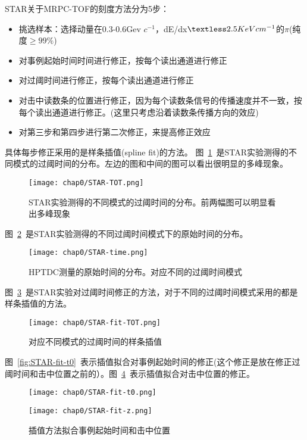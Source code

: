 STAR关于MRPC-TOF的刻度方法分为5步：
\begin{itemize}
\item{挑选样本：选择动量在0.3-0.6Gev $c^{-1}$，dE/dx$\textless2.5KeV cm^{-1}$的$\pi$(纯度$\geq99$$\%$)}
\item{对事例起始时间时间进行修正，按每个读出通道进行修正}
\item{对过阈时间进行修正，按每个读出通道进行修正}
\item{对击中读数条的位置进行修正，因为每个读数条信号的传播速度并不一致，按每个读出通道进行修正。(这里只考虑沿着读数条传播方向的效应)}
\item{对第三步和第四步进行第二次修正，来提高修正效应}
\end{itemize}

具体每步修正采用的是样条插值(spline fit)的方法。
图~\ref{fig:STAR-TOT}~是STAR实验测得的不同模式的过阈时间的分布。左边的图和中间的图可以看出很明显的多峰现象。
\begin{figure}[!h]
  \centering
  \texttt{[image: chap0/STAR-TOT.png]}
  \caption{STAR实验测得的不同模式的过阈时间的分布。前两幅图可以明显看出多峰现象}
  \label{fig:STAR-TOT}
\end{figure}

图~\ref{fig:STAR-time}~是STAR实验测得的不同过阈时间模式下的原始时间的分布。
\begin{figure}[!h]
  \centering
  \texttt{[image: chap0/STAR-time.png]}
  \caption{HPTDC测量的原始时间的分布。对应不同的过阈时间模式}
  \label{fig:STAR-time}
\end{figure}

图~\ref{fig:STAR-fit-TOT}~是STAR实验对过阈时间修正的方法，对于不同的过阈时间模式采用的都是样条插值的方法。
\begin{figure}[!h]
  \centering
  \texttt{[image: chap0/STAR-fit-TOT.png]}
  \caption{对应不同模式的过阈时间的样条插值}
  \label{fig:STAR-fit-TOT}
\end{figure}

图~\ref{fig:STAR-fit-t0}~表示插值拟合对事例起始时间的修正(这个修正是放在修正过阈时间和击中位置之前的）。图~\ref{fig:STAR-fit-z}~表示插值拟合对击中位置的修正。
\begin{figure}[!h]
\begin{minipage}[!h]{0.5\linewidth}
\centering
\texttt{[image: chap0/STAR-fit-t0.png]}
\label{fig:STAR-fit-t0}
\end{minipage}
\hfill
\begin{minipage}[!h]{0.5\linewidth}
\centering
\texttt{[image: chap0/STAR-fit-z.png]}
\label{fig:STAR-fit-z}
\end{minipage}%
\caption{插值方法拟合事例起始时间和击中位置}
\end{figure}

